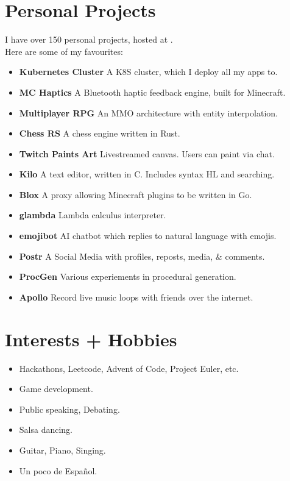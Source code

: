 \documentclass{jcgcv}
\begin{document}
\begin{column}
\section{Personal Projects}
  I have over 150 personal projects, hosted at
  .\\
  Here are some of my favourites:
  \begin{itemize}
    \item \textbf{Kubernetes Cluster} A K8S cluster, which I deploy all my apps to.
    \item \textbf{MC Haptics} A Bluetooth haptic feedback engine, built for Minecraft.
    \item \textbf{Multiplayer RPG} An MMO architecture with entity interpolation.
    \item \textbf{Chess RS} A chess engine written in Rust.
    \item \textbf{Twitch Paints Art} Livestreamed canvas. Users can paint via chat.
    \item \textbf{Kilo} A text editor, written in C. Includes syntax HL and searching.
    \item \textbf{Blox} A proxy allowing Minecraft plugins to be written in Go.
    \item \textbf{glambda} Lambda calculus interpreter.
    \item \textbf{emojibot} AI chatbot which replies to natural language with emojis.
    \item \textbf{Postr} A Social Media with profiles, reposts, media, \& comments.
    \item \textbf{ProcGen} Various experiements in procedural generation.
    \item \textbf{Apollo} Record live music loops with friends over the internet.
  \end{itemize}

\section{Interests + Hobbies}
  \begin{itemize}
    \item Hackathons, Leetcode, Advent of Code, Project Euler, etc.
    \item Game development.
    \item Public speaking, Debating.
    \item Salsa dancing.
    \item Guitar, Piano, Singing.
    \item Un poco de Espa\~nol.
  \end{itemize}

\end{column}
\end{document}
